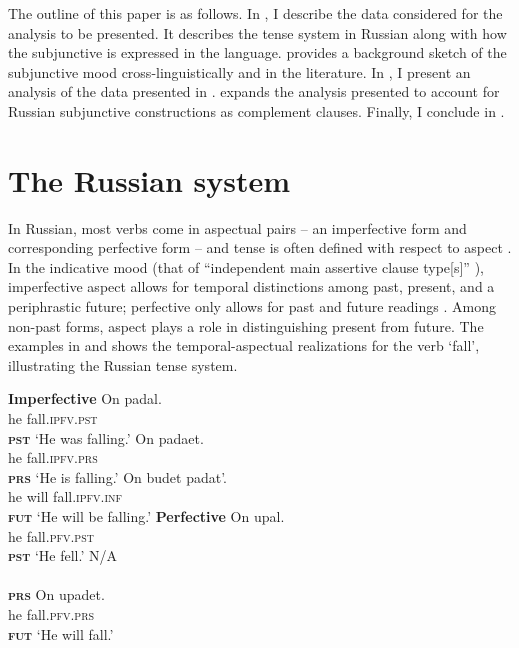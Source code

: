 \documentclass[output=paper,
modfonts,
newtxmath,
hidelinks,
]{langscibook}
\begin{document}
The outline of this paper is as follows. In , I describe the data considered for the analysis to be presented. It describes the tense system in Russian along with how the subjunctive is expressed in the language.  provides a background sketch of the subjunctive mood cross-linguistically and in the literature. In , I present an analysis of the data presented in .  expands the analysis presented to account for Russian subjunctive constructions as complement clauses. Finally, I conclude in . 

\section{The Russian system}\label{10:s2}

In Russian, most verbs come in aspectual pairs \citep[371]{Mezhevich2008} – an imperfective form and corresponding perfective form – and tense is often defined with respect to aspect \citep[373]{Mezhevich2008}. In the indicative mood (that of “independent main assertive clause type[s]” \citep[1]{Wiltschko}), imperfective aspect allows for temporal distinctions among past, present, and a periphrastic future; perfective only allows for past and future readings \citep[371]{Mezhevich2008}. Among non-past forms, aspect plays a role in distinguishing present from future. The examples in  and  shows the temporal-aspectual realizations for the verb ‘fall’, illustrating the Russian tense system.

\begin{multicols}{2}
\ea \textbf{Imperfective}\label{10:ex:ipfv}
\ea\gll On padal.\\
he fall.\textsc{ipfv.pst}\\\hfill\textsc{\textbf{pst}}
\glt `He was falling.'
\ex\gll On padaet.\\
he fall.\textsc{ipfv.prs}\\\hfill\textsc{\textbf{prs}}
\glt `He is falling.'
\ex\gll On budet padat'.\\
he will fall.\textsc{ipfv.inf}\\\hfill\textsc{\textbf{fut}}
\glt `He will be falling.'
\z\z\columnbreak
\ea \textbf{Perfective}\label{10:ex:pfv}
\ea\gll On upal.\\
he fall.\textsc{pfv.pst}\\\hfill\textsc{\textbf{pst}}
\glt `He fell.'
\ex\gll N/A\\
{}\\\hfill\textsc{\textbf{prs}}
\glt {}\vspace{14pt}
\ex\gll On upadet.\\
he fall.\textsc{pfv.prs}\\\hfill\textsc{\textbf{fut}}
\glt `He will fall.'
\z\z

\end{multicols}
\end{document}
